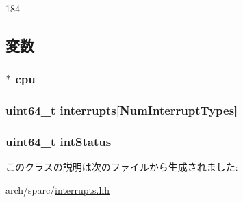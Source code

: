 \begin{DoxyCode}
184     {}
\end{DoxyCode}


\subsection{変数}
\hypertarget{classSparcISA_1_1Interrupts_a7a31ca9fefb2fe821f29a270678912db}{
\subsubsection[{cpu}]{$\ast$ {\bf cpu}}}
\label{classSparcISA_1_1Interrupts_a7a31ca9fefb2fe821f29a270678912db}
\hypertarget{classSparcISA_1_1Interrupts_af921da626984c1144929206fb7c572e4}{
\subsubsection[{interrupts}]{\setlength{\rightskip}{0pt plus 5cm}uint64\_\-t {\bf interrupts}\mbox{[}NumInterruptTypes\mbox{]}}}
\label{classSparcISA_1_1Interrupts_af921da626984c1144929206fb7c572e4}
\hypertarget{classSparcISA_1_1Interrupts_a7bd80958fef7b80f720d1e764c63adb4}{
\subsubsection[{intStatus}]{\setlength{\rightskip}{0pt plus 5cm}uint64\_\-t {\bf intStatus}}}
\label{classSparcISA_1_1Interrupts_a7bd80958fef7b80f720d1e764c63adb4}


このクラスの説明は次のファイルから生成されました:\begin{DoxyCompactItemize}
\item 
arch/sparc/\hyperlink{sparc_2interrupts_8hh}{interrupts.hh}\end{DoxyCompactItemize}
